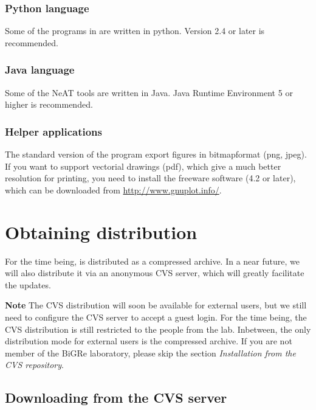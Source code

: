 \documentclass[12pt,a4paper, oneside]{scrreprt} %
\begin{document}
\subsection{Python language}

Some of the programs in \RSAT are written in python. Version 2.4 or
later is recommended.

\subsection{Java language}

Some of the NeAT tools are written in Java. Java Runtime Environment 5
or higher is recommended.

\subsection{Helper applications}

The standard version of the program  export figures
in bitmapformat (png, jpeg). If you want to support vectorial drawings
(pdf), which give a much better resolution for printing, you need to
install the freeware software  (4.2 or later), which
can be downloaded from \url{http://www.gnuplot.info/}.



\chapter{Obtaining \RSAT distribution}

For the time being, \RSAT is distributed as a compressed archive. In a
near future, we will also distribute it via an anonymous CVS server,
which will greatly facilitate the updates.

\textbf{Note} The CVS distribution will soon be available for external
users, but we still need to configure the CVS server to accept a guest
login. For the time being, the CVS distribution is still restricted to
the people from the lab. Inbetween, the only distribution mode for
external users is the compressed archive. If you are not member of the
BiGRe laboratory, please skip the section \textit{Installation from
  the CVS repository}.

\section{Downloading \RSAT from the CVS server}
\end{document}
